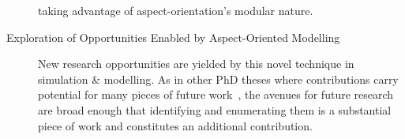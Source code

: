 \begin{description}
    taking advantage of aspect-orientation's modular nature.
  \item[Exploration of Opportunities Enabled by Aspect-Oriented Modelling]
    New research opportunities are yielded by this novel technique in simulation
    \& modelling. As in other PhD theses where contributions carry potential for
    many pieces of future work~\cite{marsh1994formalising}, the avenues for future research are broad enough that
    identifying and enumerating them is a substantial piece of work and
    constitutes an additional contribution.
\end{description}









